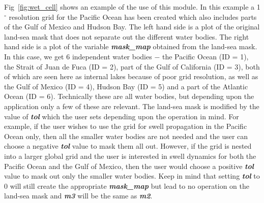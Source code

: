 \documentclass[12pt]{article}
\begin{document}
Fig~\ref{fig:wet_cell} shows an example of the use of this module. In this example a 1$^\circ$ resolution grid for the Pacific Ocean has been created which also includes parts of the Gulf of Mexico and Hudson Bay. The left hand side is a plot of the original land-sea mask that does not separate out the different water bodies. The right hand side is a plot of the variable \textbf{\textit {mask\_map}} obtained from the land-sea mask. In this case, we get 6 independent water bodies $-$ the Pacific Ocean (ID = 1), the Strait of Juan de Fuca (ID = 2), part of the Gulf of California (ID = 3), both of which are seen here as internal lakes because of poor grid resolution, as well as the Gulf of Mexico (ID = 4), Hudson Bay (ID = 5) and a part of the Atlantic Ocean (ID = 6). Technically these are all water bodies, but depending upon the application only a few of these are relevant. The land-sea mask is modified by the value of \textbf{\textit {tol}} which the user sets depending upon the operation in mind. For example, if the user wishes to use the grid for swell propagation in the Pacific Ocean only, then all the smaller water bodies are not needed and the user can choose a negative \textbf{\textit{tol}} value to mask them all out. However, if the grid is nested into a larger global grid and the user is interested in swell dynamics for both the Pacific Ocean and the Gulf of Mexico, then the user would choose a positive \textbf{\textit {tol}} value to mask out only the smaller water bodies. Keep in mind that setting \textbf {\textit {tol}} to 0 will still create the appropriate \textbf{\textit {mask\_map}} but lead to no operation on the land-sea mask and \textbf {\textit {m3}} will be the same as \textbf{\textit{m2}}. 
\end{document}
